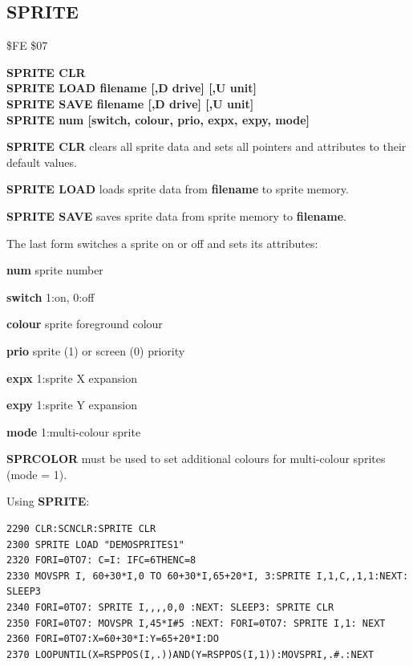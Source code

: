 \subsection{SPRITE}
\begin{description}[leftmargin=2cm,style=nextline]
\item [Token:] \$FE \$07
\item [Format:] {\bf SPRITE CLR} \\
                {\bf SPRITE LOAD filename [,D drive] [,U unit]} \\
                {\bf SPRITE SAVE filename [,D drive] [,U unit]} \\
                {\bf SPRITE num [switch, colour, prio, expx, expy, mode]}
\item [Usage:]  {\bf SPRITE CLR} clears all sprite data and sets all pointers
                and attributes to their default values.

                {\bf SPRITE LOAD } loads sprite data from {\bf filename}
                to sprite memory.

                {\bf SPRITE SAVE } saves sprite data from
                sprite memory to {\bf filename}.

                \filenamedefinition

                The last form switches a sprite on or off and sets its attributes:

                {\bf num} sprite number

                {\bf switch} 1:on, 0:off

                {\bf colour} sprite foreground colour

                {\bf prio} sprite (1) or screen (0) priority

                {\bf expx} 1:sprite X expansion

                {\bf expy} 1:sprite Y expansion

                {\bf mode} 1:multi-colour sprite

\item [Remarks:] {\bf SPRCOLOR} must be used to set
                additional colours
                for multi-colour sprites (mode = 1).

\item [Example:] Using {\bf SPRITE}:
\begin{tcolorbox}[colback=black,coltext=white]
\verbatimfont{\codefont}
\begin{verbatim}
2290 CLR:SCNCLR:SPRITE CLR
2300 SPRITE LOAD "DEMOSPRITES1"
2320 FORI=0TO7: C=I: IFC=6THENC=8
2330 MOVSPR I, 60+30*I,0 TO 60+30*I,65+20*I, 3:SPRITE I,1,C,,1,1:NEXT: SLEEP3
2340 FORI=0TO7: SPRITE I,,,,0,0 :NEXT: SLEEP3: SPRITE CLR
2350 FORI=0TO7: MOVSPR I,45*I#5 :NEXT: FORI=0TO7: SPRITE I,1: NEXT
2360 FORI=0TO7:X=60+30*I:Y=65+20*I:DO
2370 LOOPUNTIL(X=RSPPOS(I,.))AND(Y=RSPPOS(I,1)):MOVSPRI,.#.:NEXT
\end{verbatim}
\end{tcolorbox}
\end{description}

